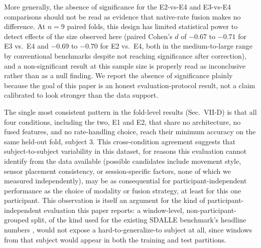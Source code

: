 \documentclass[conference]{IEEEtran}
\begin{document}
More generally, the absence of significance for the E2-vs-E4 and
E3-vs-E4 comparisons should not be read as evidence that native-rate
fusion makes no difference. At $n=9$ paired folds, this design has
limited statistical power to detect effects of the size observed here
(paired Cohen's $d$ of $-0.67$ to $-0.71$ for E3 vs.\ E4 and $-0.69$
to $-0.70$ for E2 vs.\ E4, both in the medium-to-large range by
conventional benchmarks despite not reaching significance after
correction), and a non-significant result at this sample size is
properly read as inconclusive rather than as a null finding. We
report the absence of significance plainly because the goal of this
paper is an honest evaluation-protocol result, not a claim calibrated
to look stronger than the data support.

The single most consistent pattern in the fold-level results
(Sec.~VII-D) is that all four conditions, including the two, E1 and
E2, that share no architecture, no fused features, and no
rate-handling choice, reach their minimum accuracy on the same
held-out fold, subject 3. This cross-condition agreement suggests
that subject-to-subject variability in this dataset, for reasons this
evaluation cannot identify from the data available (possible
candidates include movement style, sensor placement consistency, or
session-specific factors, none of which we measured independently),
may be as consequential for participant-independent performance as
the choice of modality or fusion strategy, at least for this one
participant. This observation is itself an argument for the kind of
participant-independent evaluation this paper reports: a window-level,
non-participant-grouped split, of the kind used for the existing
SDALLE benchmark's headline numbers \cite{farouk2026sdalle}, would not
expose a hard-to-generalize-to subject at all, since windows from that
subject would appear in both the training and test partitions.
\end{document}
